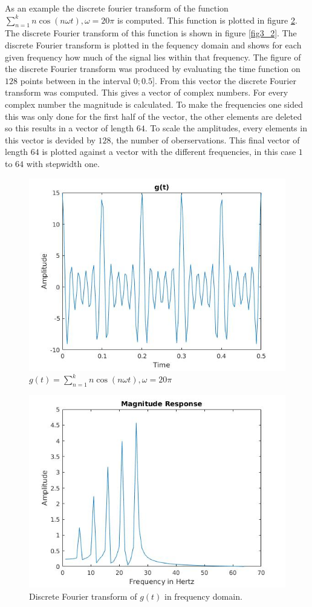 \documentclass[12pt]{article}
\begin{document}
As an example the discrete fourier transform of the function $\sum_{n=1}^{k} n \cos(n\omega t), \omega = 20 \pi$ is computed. This function is plotted in figure \ref{fig3_1}. The discrete Fourier transform of this function is shown in figure \ref{fig3_2}. The discrete Fourier transform is plotted in the fequency domain and shows for each given frequency how much of the signal lies within that frequency. 
The figure of the discrete Fourier transform was produced by evaluating the time function on $128$ points between in the interval $0;0.5]$. From this vector the discrete Fourier transform was computed. This gives a vector of complex numbers. For every complex number the magnitude is calculated. To make the frequencies one sided this was only done for the first half of the vector, the other elements are deleted so this results in a vector of length $64$. To scale the amplitudes, every elements in this vector is devided by $128$, the number of oberservations. This final vector of length $64$ is plotted against a vector with the different frequencies, in this case $1$ to $64$ with stepwidth one.
\begin{figure}[H]
\centering
\includegraphics[width=0.6\linewidth,natwidth=610,natheight=642]{ex3_func_wiki_1_func.jpg}
\caption{$g(t)= \sum_{n=1}^{k} n \cos(n\omega t), \omega = 20 \pi$}
\label{fig3_1}
\end{figure}
%
\begin{figure}[H]
\centering
\includegraphics[width=0.6\linewidth,natwidth=610,natheight=642]{ex3_func_wiki_1_four.jpg}
\caption{Discrete Fourier transform of $g(t)$ in frequency domain.}
\label{fig3_1}
\end{figure}
\end{document}

